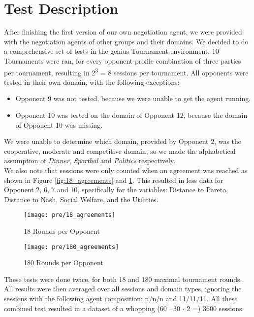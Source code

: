 \section{Test Description}

After finishing the first version of our own negotiation agent, we were provided with the negotiation agents of other groups and their domains. We decided to do a comprehensive set of tests in the genius Tournament environment. 10 Tournaments were ran, for every opponent-profile combination of three parties per tournament, resulting in 2\textsuperscript{3} = 8 sessions per tournament. All opponents were tested in their own domain, with the following exceptions:

\begin{itemize}
	\item Opponent 9 was not tested, because we were unable to get the agent running. 
	\item Opponent 10 was tested on the domain of Opponent 12, because the domain of Opponent 10 was missing.
\end{itemize}

We were unable to determine which domain, provided by Opponent 2, was the cooperative, moderate and competitive domain, so we made the alphabetical assumption of \textit{Dinner}, \textit{Sporthal} and \textit{Politics} respectively. \\

We also note that sessions were only counted when an agreement was reached as shown in Figure \ref{fig:18_agreements} and \ref{fig:180_agreements}. This resulted in less data for Opponent 2, 6, 7 and 10, specifically for the variables: Distance to Pareto, Distance to Nash, Social Welfare, and the Utilities.

\begin{figure}[!htb]
	\texttt{[image: pre/18\_agreements]}
	\caption{18 Rounds per Opponent}
	\label{fig:18_agreements}
	\endminipage\hfill
	\texttt{[image: pre/180\_agreements]}
	\caption{180 Rounds per Opponent}
	\label{fig:180_agreements}
	\endminipage\hfill
\end{figure}

These tests were done twice, for both 18 and 180 maximal tournament rounds.
All results were then averaged over all sessions and domain types, ignoring the sessions with the following agent composition: n/n/n and 11/11/11. All these combined test resulted in a dataset of a whopping (60 $\cdot$ 30 $\cdot$ 2 =) 3600 sessions.